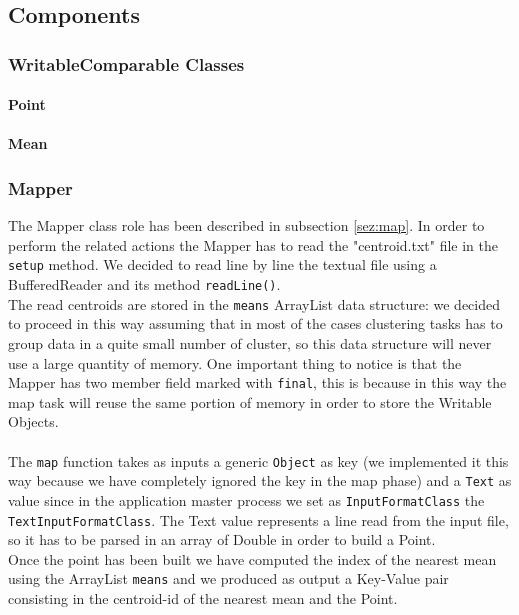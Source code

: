 \documentclass[11pt,a4paper]{article}
\begin{document}
\subsection{Components}
\subsubsection{WritableComparable Classes}
\paragraph{Point}
\paragraph{Mean}

\subsubsection{Mapper}
The Mapper class role has been described in subsection \ref{sez:map}. In order to perform the related actions the Mapper has to read the "centroid.txt" file in the \texttt{setup} method. We decided to read line by line the textual file using a BufferedReader and its method \texttt{readLine()}.\\
The read centroids are stored in the \texttt{means} ArrayList data structure: we decided to proceed in this way assuming that in most of the cases clustering tasks has to group data in a quite small number of cluster, so this data structure will never use a large quantity of memory. One important thing to notice is that the Mapper has two member field marked with \texttt{final}, this is because in this way the map task will reuse the same portion of memory in order to store the Writable Objects.\\\\
The \texttt{map} function takes as inputs a generic \texttt{Object} as key (we implemented it this way because we have completely ignored the key in the map phase) and a \texttt{Text} as value since in the application master process we set as \texttt{InputFormatClass} the \texttt{TextInputFormatClass}. The Text value represents a line read from the input file, so it has to be parsed in an array of Double in order to build a Point.\\
Once the point has been built we have computed the index of the nearest mean using the ArrayList \texttt{means} and we produced as output a Key-Value pair consisting in the centroid-id of the nearest mean and the Point.
\end{document}
